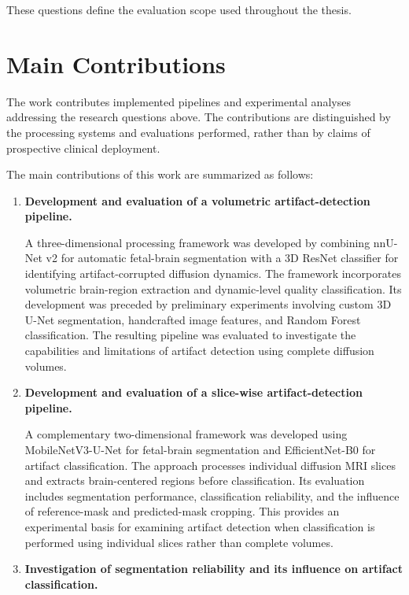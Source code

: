 These questions define the evaluation scope used throughout the thesis.

\section{Main Contributions}

The work contributes implemented pipelines and experimental analyses addressing the research questions above. The contributions are distinguished by the processing systems and evaluations performed, rather than by claims of prospective clinical deployment.

The main contributions of this work are summarized as follows:

\begin{enumerate}
    \item \textbf{Development and evaluation of a volumetric artifact-detection pipeline.}

    A three-dimensional processing framework was developed by combining nnU-Net v2 for automatic fetal-brain segmentation with a 3D ResNet classifier for identifying artifact-corrupted diffusion dynamics. The framework incorporates volumetric brain-region extraction and dynamic-level quality classification. Its development was preceded by preliminary experiments involving custom 3D U-Net segmentation, handcrafted image features, and Random Forest classification. The resulting pipeline was evaluated to investigate the capabilities and limitations of artifact detection using complete diffusion volumes.

    \item \textbf{Development and evaluation of a slice-wise artifact-detection pipeline.}

    A complementary two-dimensional framework was developed using MobileNetV3-U-Net for fetal-brain segmentation and EfficientNet-B0 for artifact classification. The approach processes individual diffusion MRI slices and extracts brain-centered regions before classification. Its evaluation includes segmentation performance, classification reliability, and the influence of reference-mask and predicted-mask cropping. This provides an experimental basis for examining artifact detection when classification is performed using individual slices rather than complete volumes.

    \item \textbf{Investigation of segmentation reliability and its influence on artifact classification.}


\end{enumerate}

